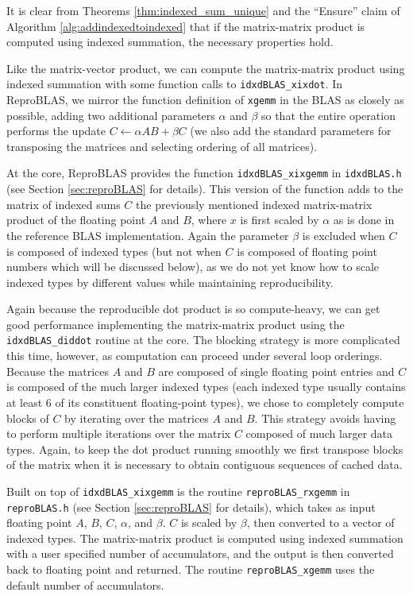   It is clear from Theorems \ref{thm:indexed_sum_unique} and the ``Ensure'' claim of Algorithm \ref{alg:addindexedtoindexed} that if the matrix-matrix product is computed using indexed summation, the necessary properties hold.

  Like the matrix-vector product, we can compute the matrix-matrix product using indexed summation with some function calls to \texttt{idxdBLAS\_xixdot}. In ReproBLAS, we mirror the function definition of \texttt{xgemm} in the BLAS as closely as possible, adding two additional parameters $\alpha$ and $\beta$ so that the entire operation performs the update $C \gets \alpha AB + \beta C$ (we also add the standard parameters for transposing the matrices and selecting ordering of all matrices).

  At the core, ReproBLAS provides the function \texttt{idxdBLAS\_xixgemm} in \texttt{idxdBLAS.h} (see Section \ref{sec:reproBLAS} for details). This version of the function adds to the matrix of indexed sums $C$ the previously mentioned indexed matrix-matrix product of the floating point $A$ and $B$, where $x$ is first scaled by $\alpha$ as is done in the reference BLAS implementation. Again the parameter $\beta$ is excluded when $C$ is composed of indexed types (but not when $C$ is composed of floating point numbers which will be discussed below), as we do not yet know how to scale indexed types by different values while maintaining reproducibility.

  Again because the reproducible dot product is so compute-heavy, we can get good performance implementing the matrix-matrix product using the \texttt{idxdBLAS\_diddot} routine at the core. The blocking strategy is more complicated this time, however, as computation can proceed under several loop orderings. Because the matrices $A$ and $B$ are composed of single floating point entries and $C$ is composed of the much larger indexed types (each indexed type usually contains at least 6 of its constituent floating-point types), we chose to completely compute blocks of $C$ by iterating over the matrices $A$ and $B$. This strategy avoids having to perform multiple iterations over the matrix $C$ composed of much larger data types. Again, to keep the dot product running smoothly we first transpose blocks of the matrix when it is necessary to obtain contiguous sequences of cached data.

  Built on top of \texttt{idxdBLAS\_xixgemm} is the routine \texttt{reproBLAS\_rxgemm} in \texttt{reproBLAS.h} (see Section \ref{sec:reproBLAS} for details), which takes as input floating point $A$, $B$, $C$, $\alpha$, and $\beta$. $C$ is scaled by $\beta$, then converted to a vector of indexed types. The matrix-matrix product is computed using indexed summation with a user specified number of accumulators, and the output is then converted back to floating point and returned. The routine \texttt{reproBLAS\_xgemm} uses the default number of accumulators.
